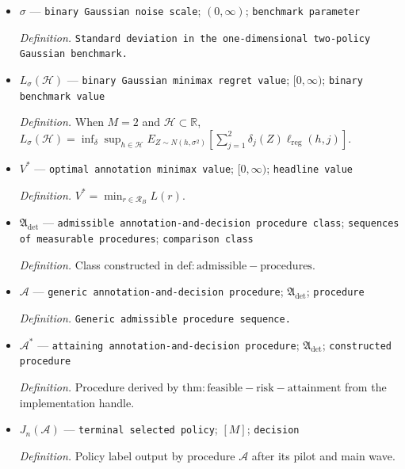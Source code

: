 \documentclass{article}
\begin{document}
\begin{itemize}
  \par\smallskip\noindent\emph{Definition.} \(L(r)=\inf_\delta\sup_{h\in\mathcal H}E_{Z\sim N(h,\Sigma(r))}[\sum_{j=1}^{M}\delta_j(Z)\ell_{\mathrm{reg}}(h,j)]\).
  \item \(\sigma\) --- \texttt{binary Gaussian noise scale}; \((0,\infty)\); \texttt{benchmark parameter}
  \par\smallskip\noindent\emph{Definition.} \texttt{Standard deviation in the one-\allowbreak{}dimensional two-\allowbreak{}policy Gaussian benchmark.}
  \item \(L_{\sigma}(\mathcal H)\) --- \texttt{binary Gaussian minimax regret value}; \([0,\infty)\); \texttt{binary benchmark value}
  \par\smallskip\noindent\emph{Definition.} When \(M=2\) and \(\mathcal H\subset\mathbb R\), \(L_{\sigma}(\mathcal H)=\inf_\delta\sup_{h\in\mathcal H}E_{Z\sim N(h,\sigma^2)}[\sum_{j=1}^{2}\delta_j(Z)\ell_{\mathrm{reg}}(h,j)]\).
  \item \(V^*\) --- \texttt{optimal annotation minimax value}; \([0,\infty)\); \texttt{headline value}
  \par\smallskip\noindent\emph{Definition.} \(V^*=\min_{r\in\mathcal R_B}L(r)\).
  \item \(\mathfrak A_{\mathrm{det}}\) --- \texttt{admissible annotation-\allowbreak{}and-\allowbreak{}decision procedure class}; \texttt{sequences of measurable procedures}; \texttt{comparison class}
  \par\smallskip\noindent\emph{Definition.} Class constructed in \(\mathrm{def:admissible-procedures}\).
  \item \(\mathcal A\) --- \texttt{generic annotation-\allowbreak{}and-\allowbreak{}decision procedure}; \(\mathfrak A_{\mathrm{det}}\); \texttt{procedure}
  \par\smallskip\noindent\emph{Definition.} \texttt{Generic admissible procedure sequence.}
  \item \(\mathcal A^*\) --- \texttt{attaining annotation-\allowbreak{}and-\allowbreak{}decision procedure}; \(\mathfrak A_{\mathrm{det}}\); \texttt{constructed procedure}
  \par\smallskip\noindent\emph{Definition.} Procedure derived by \(\mathrm{thm:feasible-risk-attainment}\) from the implementation handle.
  \item \(J_n(\mathcal A)\) --- \texttt{terminal selected policy}; \([M]\); \texttt{decision}
  \par\smallskip\noindent\emph{Definition.} Policy label output by procedure \(\mathcal A\) after its pilot and main wave.

\end{itemize}
\end{document}
